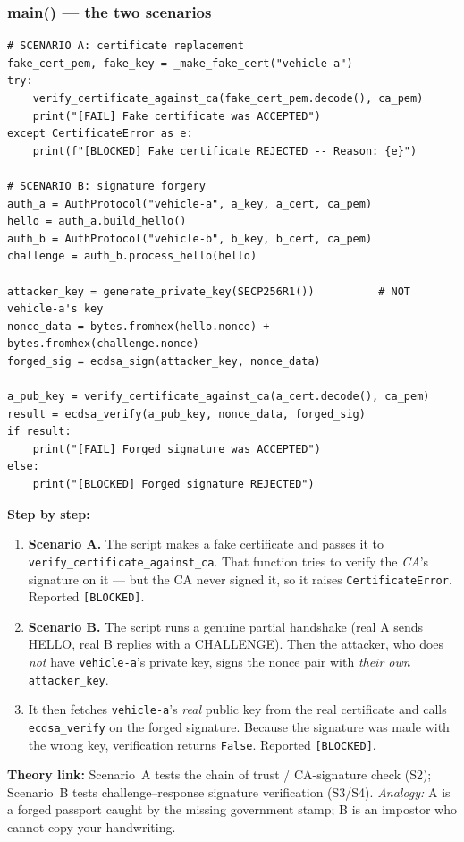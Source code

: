 \documentclass[11pt,a4paper]{article}
\begin{document}
\subsubsection*{main() --- the two scenarios}
\begin{lstlisting}[style=py,caption={mitm\_attack.py --- the two MITM scenarios (key parts).}]
# SCENARIO A: certificate replacement
fake_cert_pem, fake_key = _make_fake_cert("vehicle-a")
try:
    verify_certificate_against_ca(fake_cert_pem.decode(), ca_pem)
    print("[FAIL] Fake certificate was ACCEPTED")
except CertificateError as e:
    print(f"[BLOCKED] Fake certificate REJECTED -- Reason: {e}")

# SCENARIO B: signature forgery
auth_a = AuthProtocol("vehicle-a", a_key, a_cert, ca_pem)
hello = auth_a.build_hello()
auth_b = AuthProtocol("vehicle-b", b_key, b_cert, ca_pem)
challenge = auth_b.process_hello(hello)

attacker_key = generate_private_key(SECP256R1())          # NOT vehicle-a's key
nonce_data = bytes.fromhex(hello.nonce) + bytes.fromhex(challenge.nonce)
forged_sig = ecdsa_sign(attacker_key, nonce_data)

a_pub_key = verify_certificate_against_ca(a_cert.decode(), ca_pem)
result = ecdsa_verify(a_pub_key, nonce_data, forged_sig)
if result:
    print("[FAIL] Forged signature was ACCEPTED")
else:
    print("[BLOCKED] Forged signature REJECTED")
\end{lstlisting}
\textbf{Step by step:}
\begin{enumerate}
  \item \textbf{Scenario A.} The script makes a fake certificate and passes it to
        \texttt{verify\_certificate\_against\_ca}. That function tries to verify
        the \emph{CA}'s signature on it --- but the CA never signed it, so it
        raises \texttt{CertificateError}. Reported \texttt{[BLOCKED]}.
  \item \textbf{Scenario B.} The script runs a genuine partial handshake (real A
        sends HELLO, real B replies with a CHALLENGE). Then the attacker, who
        does \emph{not} have \texttt{vehicle-a}'s private key, signs the nonce
        pair with \emph{their own} \texttt{attacker\_key}.
  \item It then fetches \texttt{vehicle-a}'s \emph{real} public key from the real
        certificate and calls \texttt{ecdsa\_verify} on the forged signature.
        Because the signature was made with the wrong key, verification returns
        \texttt{False}. Reported \texttt{[BLOCKED]}.
\end{enumerate}
\textbf{Theory link:} Scenario~A tests the chain of trust / CA-signature check
(S2); Scenario~B tests challenge--response signature verification (S3/S4).
\emph{Analogy:} A is a forged passport caught by the missing government stamp;
B is an impostor who cannot copy your handwriting.
\end{document}
